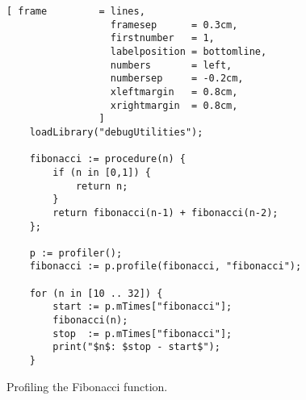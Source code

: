 \begin{figure}[!ht]
\centering
\begin{Verbatim}[ frame         = lines, 
                  framesep      = 0.3cm, 
                  firstnumber   = 1,
                  labelposition = bottomline,
                  numbers       = left,
                  numbersep     = -0.2cm,
                  xleftmargin   = 0.8cm,
                  xrightmargin  = 0.8cm,
                ]
    loadLibrary("debugUtilities");
    
    fibonacci := procedure(n) {
        if (n in [0,1]) {
            return n;
        }
        return fibonacci(n-1) + fibonacci(n-2);
    };
    
    p := profiler();
    fibonacci := p.profile(fibonacci, "fibonacci");
    
    for (n in [10 .. 32]) {
        start := p.mTimes["fibonacci"];
        fibonacci(n);
        stop  := p.mTimes["fibonacci"];
        print("$n$: $stop - start$");
    }
\end{Verbatim}
\vspace*{-0.3cm}
\caption{Profiling the Fibonacci function.}
\label{fig:fibonacci-timed.stlx}
\end{figure}

